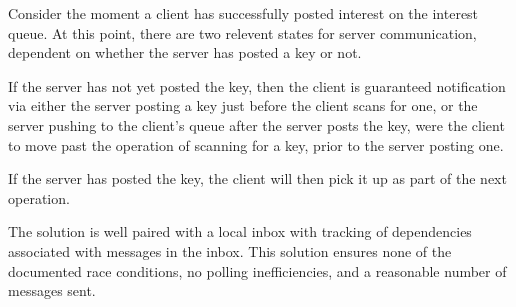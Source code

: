 \documentclass[a4paper,10pt]{article}
\begin{document}
Consider the moment a client has successfully posted interest on the interest queue.
At this point, there are two relevent states for server communication,
dependent on whether the server has posted a key or not.

If the server has not yet posted the key, then the client is guaranteed
notification via either the server posting a key just before the client scans
for one, or the server pushing to the client's queue after the server posts the
key, were the client to move past the operation of scanning for a key, prior to
the server posting one.

If the server has posted the key, the client will then pick it up as part of
the next operation.

The solution is well paired with a local inbox with tracking of dependencies
associated with messages in the inbox.
This solution ensures none of the documented race conditions, no polling
inefficiencies, and a reasonable number of messages sent.
\end{document}
